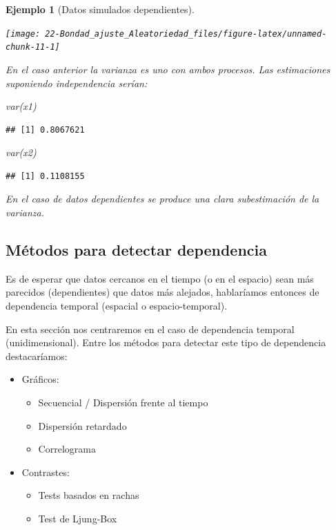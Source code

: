 \documentclass[
]{book}
\newenvironment{Shaded}{\begin{snugshade}}{\end{snugshade}}
\newcommand{\FunctionTok}[1]{\textcolor[rgb]{0.00,0.00,0.00}{#1}}
\newcommand{\NormalTok}[1]{#1}
\theoremstyle{break}
\newtheorem{example}{Ejemplo}[chapter]
\theoremstyle{nonumberplain}
\begin{document}
\begin{example}[Datos simulados dependientes]
\begin{center}\texttt{[image: 22-Bondad\_ajuste\_Aleatoriedad\_files/figure-latex/unnamed-chunk-11-1]} \end{center}

En el caso anterior la varianza es uno con ambos procesos.
Las estimaciones suponiendo independencia serían:

\begin{Shaded}
\begin{Highlighting}[]
\FunctionTok{var}\NormalTok{(x1)}
\end{Highlighting}
\end{Shaded}

\begin{verbatim}
## [1] 0.8067621
\end{verbatim}

\begin{Shaded}
\begin{Highlighting}[]
\FunctionTok{var}\NormalTok{(x2)}
\end{Highlighting}
\end{Shaded}

\begin{verbatim}
## [1] 0.1108155
\end{verbatim}

En el caso de datos dependientes se produce una clara subestimación de la varianza.
\end{example}

\hypertarget{muxe9todos-para-detectar-dependencia}{%
\subsection{Métodos para detectar dependencia}\label{muxe9todos-para-detectar-dependencia}}

Es de esperar que datos cercanos en el tiempo (o en el espacio)
sean más parecidos (dependientes) que datos más alejados, hablaríamos entonces de dependencia temporal (espacial o espacio-temporal).

En esta sección nos centraremos en el caso de dependencia temporal (unidimensional).
Entre los métodos para detectar este tipo de dependencia destacaríamos:

\begin{itemize}
\item
  Gráficos:

  \begin{itemize}
  \item
    Secuencial / Dispersión frente al tiempo
  \item
    Dispersión retardado
  \item
    Correlograma
  \end{itemize}
\item
  Contrastes:

  \begin{itemize}
  \item
    Tests basados en rachas
  \item
    Test de Ljung-Box
  \end{itemize}
\end{itemize}
\end{document}

